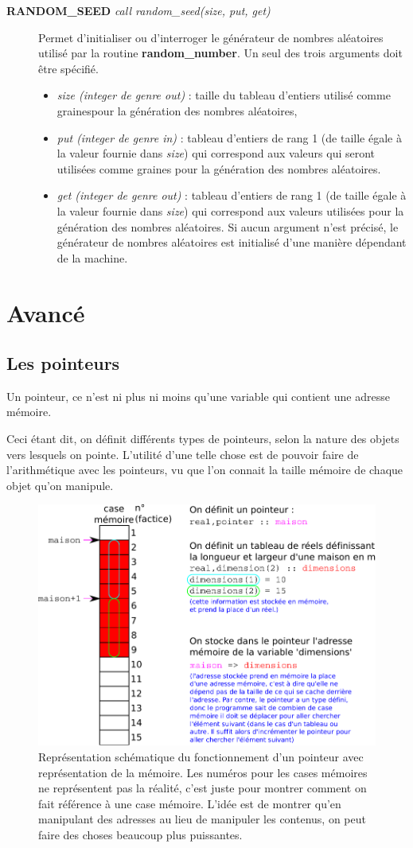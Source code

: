 \documentclass[a4paper,twoside]{article}
\begin{document}
\begin{description}
\item[\textbf{RANDOM\_SEED} \emph{call random\_seed(size, put, get)}] Permet d'initialiser ou d'interroger le gé\-né\-ra\-teur de nombres aléatoires utilisé par la routine \textbf{random\_number}. Un seul des trois arguments doit être spécifié. 
\begin{itemize}
\item \emph{size (integer de genre out)} : taille du tableau d'entiers utilisé comme \og graines\fg pour la génération des nombres aléatoires,
\item \emph{put (integer de genre in)} : tableau d'entiers de rang 1 (de taille égale à la valeur fournie dans \emph{size}) qui correspond aux valeurs qui seront utilisées comme graines pour la génération des nombres aléatoires.
\item \emph{get (integer de genre out)} : tableau d'entiers de rang 1 (de taille égale à la valeur fournie dans \emph{size}) qui correspond aux valeurs utilisées pour la génération des nombres aléatoires. Si aucun argument n'est précisé, le générateur de nombres aléatoires est initialisé d'une manière dépendant de la machine.
\end{itemize}
\end{description}

\section{Avancé}
\subsection{Les pointeurs}
Un pointeur, ce n'est ni plus ni moins qu'une variable qui contient une adresse mémoire. 

Ceci étant dit, on définit différents types de pointeurs, selon la nature des objets vers lesquels on pointe. L'utilité d'une telle chose est de pouvoir faire de l'arithmétique avec les pointeurs, vu que l'on connait la taille mémoire de chaque objet qu'on manipule. 

\begin{figure}[htb]
\centering
\includegraphics[width=0.65\linewidth]{figure/pointeurs.pdf}
\caption{Représentation schématique du fonctionnement d'un pointeur avec représentation de la mémoire. Les numéros pour les cases mémoires ne représentent pas la réalité, c'est juste pour montrer comment on fait référence à une case mémoire. L'idée est de montrer qu'en manipulant des adresses au lieu de manipuler les contenus, on peut faire des choses beaucoup plus puissantes.}
\end{figure}
\end{document}
